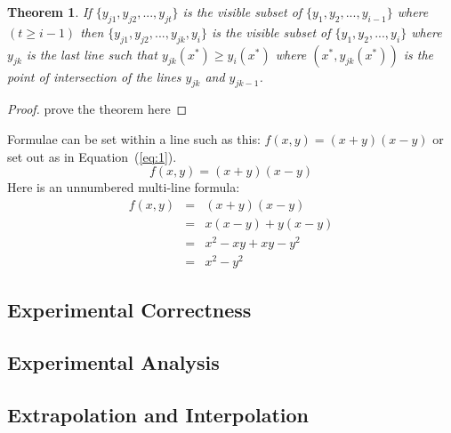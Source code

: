 \documentclass{article}
\newtheorem{theorem}{Theorem}
\begin{document}
\begin{theorem}
  If \emph{$\{y_{j1},y_{j2},...,y_{jt}\}$} is the visible subset of \emph{$\{y_{1},y_{2},...,y_{i-1}\}$} where \emph{$(t \geq i-1)$} then $\{y_{j1},y_{j2},...,y_{jk},y_{i}\}$ is the visible subset of $\{y_{1},y_{2},...,y_{i}\}$ where $y_{jk}$ is the last line such that $y_{jk}(x^{*}) \geq y_{i}(x^{*})$ where $(x^{*},y_{jk}(x^{*}))$ is the point of intersection of the lines $y_{jk}$ and $y_{jk-1}$.
\end{theorem}

\begin{proof}
prove the theorem here
\end{proof}


Formulae can be set within a line such as this: $f(x,y) = (x+y)(x-y)$
or set out as in Equation~(\ref{eq:1}).
\begin{equation}
  \label{eq:1}
  f(x,y) = (x+y)(x-y)
\end{equation}
Here is an unnumbered multi-line formula:
\begin{eqnarray*}
  \label{eq:2}
  f(x,y) &= & (x+y)(x-y) \\
  & = & x(x-y) + y(x-y) \\
  & = & x^2 - xy + xy - y^2 \\
  & = & x^2-y^2
\end{eqnarray*}

\subsection*{Experimental Correctness}


\subsection*{Experimental Analysis}


\subsection*{Extrapolation and Interpolation}
\end{document}

